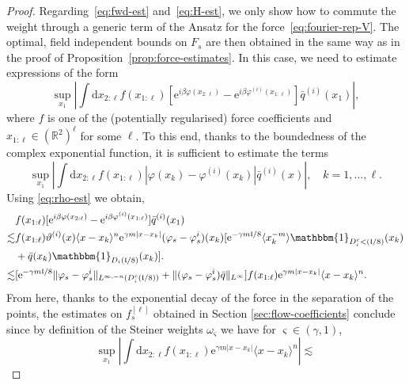 \documentclass[11pt, a4paper]{scrartcl}
\numberwithin{equation}{section}
\theoremstyle{plain}
\theoremstyle{remark}
\newcommand{\mathd}{\mathrm{d}}
\newcommand{\mathe}{\mathrm{e}}
\begin{document}
\begin{proof}
  Regarding~\eqref{eq:fwd-est} and~\eqref{eq:H-est}, we only show how to
  commute the weight through a generic term of the Ansatz for the
  force~\eqref{eq:fourier-rep-V}. The optimal, field independent bounds on
  $F_s$ are then obtained in the same way as in the proof of
  Proposition~\ref{prop:force-estimates}. In this case, we need to estimate
  expressions of the form
  \[ \sup_{x_1} \left| \int \mathd x_{2 : \ell} f (x_{1 : \ell}) [\mathe^{i
     \beta \varphi (x_{2 : \ell})} - \mathe^{i \beta \varphi^{(i)} (x_{1 :
     \ell})}]  \bar{q}^{(i)} (x_1) \right|, \]
  where $f$ is one of the (potentially regularised) force coefficients and
  $x_{1 : \ell} \in (\mathbb{R}^2)^{\ell}$ for some $\ell$. To this end,
  thanks to the boundedness of the complex exponential function, it is
  sufficient to estimate the terms
  \[ \sup_{x_1}  \left| \int \mathd x_{2 : \ell} f (x_{1 : \ell}) | \varphi
     (x_k) - \varphi^{(i)} (x_k) |  \bar{q}^{(i)} (x) \right|, \quad k = 1,
     \ldots, \ell . \]
  Using \eqref{eq:rho-est} we obtain,
  \begin{equation}
    \begin{aligned}
      & f (x_{1 : \ell}) [\mathe^{i \beta \varphi (x_{2 : \ell})} - \mathe^{i
      \beta \varphi^{(i)} (x_{1 : \ell})}]  \bar{q}^{(i)} (x_1)\\
      \lesssim & f (x_{1 : \ell}) \vartheta^{(i)} (x) \langle x - x_k \rangle^n
      \mathe^{\gamma m | x - x_k |} (\varphi_s - \varphi_s^i) (x_k) [\mathe^{-
      \gamma m\mathfrak{l}/ 8} \langle x_k^{- m} \rangle \mathbbm{1}_{D_i^c
<      (\mathfrak{l}/ 8)} (x_k) \\
      &+ \bar{q} (x_k) \mathbbm{1}_{D_i (\mathfrak{l}/
      8)} (x_k)] .\\
      \lesssim & [\mathe^{- \gamma m\mathfrak{l}/ 8}  \| \varphi_s -
      \varphi_s^i \|_{L^{\infty, - n} (D_i^c (\mathfrak{l}/ 8))} + \|
      (\varphi_s - \varphi_s^i)  \bar{q} \|_{L^{\infty}}] f (x_{1 : \ell})
      \mathe^{\gamma m | x - x_k |} \langle x - x_k \rangle^n .
    \end{aligned} \label{eq:exp-sep}
  \end{equation}
  From here, thanks to the exponential decay of the force in the separation of
  the points, the estimates on $f^{[\ell]}_s$ obtained in Section
  \ref{sec:flow-coefficients} conclude since by definition of the Steiner
  weights $\omega_{\varsigma}$ we have for $\varsigma \in (\gamma, 1)$,
  \[ \sup_{x_1} \left| \int \mathd x_{2 : \ell} f (x_{1 : \ell})
     \mathe^{\gamma m | x - x_k |} \langle x - x_k \rangle^n \right| \lesssim
\]
\end{proof}
\end{document}
